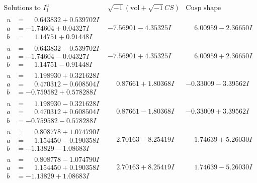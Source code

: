 \documentclass[1p]{elsarticle_modified}
\theoremstyle{definition}
\newcommand{\I}{\sqrt{-1}}
\begin{document}
$$\begin{array}{c|c|c}  
\text{Solutions to }I^u_{1}& \I (\text{vol} + \sqrt{-1}CS) & \text{Cusp shape}\\
 \hline 
\begin{aligned}
u &= \phantom{-}0.643832 + 0.539702 I \\
a &= -1.74604 + 0.04327 I \\
b &= \phantom{-}1.14751 + 0.91448 I\end{aligned}
 & -7.56901 - 4.35325 I & \phantom{-}6.00959 - 2.36650 I \\ \hline\begin{aligned}
u &= \phantom{-}0.643832 - 0.539702 I \\
a &= -1.74604 - 0.04327 I \\
b &= \phantom{-}1.14751 - 0.91448 I\end{aligned}
 & -7.56901 + 4.35325 I & \phantom{-}6.00959 + 2.36650 I \\ \hline\begin{aligned}
u &= \phantom{-}1.198930 + 0.321628 I \\
a &= \phantom{-}0.470312 - 0.608504 I \\
b &= -0.759582 + 0.578288 I\end{aligned}
 & \phantom{-}0.87661 + 1.80368 I & -0.33009 - 3.39562 I \\ \hline\begin{aligned}
u &= \phantom{-}1.198930 - 0.321628 I \\
a &= \phantom{-}0.470312 + 0.608504 I \\
b &= -0.759582 - 0.578288 I\end{aligned}
 & \phantom{-}0.87661 - 1.80368 I & -0.33009 + 3.39562 I \\ \hline\begin{aligned}
u &= \phantom{-}0.808778 + 1.074790 I \\
a &= \phantom{-}1.154450 - 0.190358 I \\
b &= -1.13829 - 1.08683 I\end{aligned}
 & \phantom{-}2.70163 - 8.25419 I & \phantom{-}1.74639 + 5.26030 I \\ \hline\begin{aligned}
u &= \phantom{-}0.808778 - 1.074790 I \\
a &= \phantom{-}1.154450 + 0.190358 I \\
b &= -1.13829 + 1.08683 I\end{aligned}
 & \phantom{-}2.70163 + 8.25419 I & \phantom{-}1.74639 - 5.26030 I \\ \hline\begin{aligned}

\end{aligned}
\end{array}$$
\end{document}
